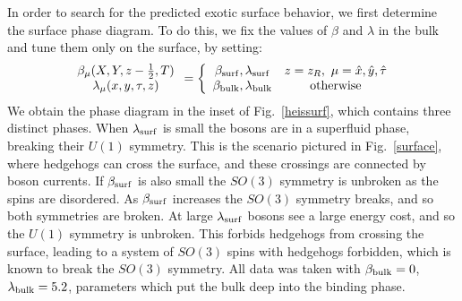 \documentclass[prb,twocolumn]{revtex4-1}
\begin{document}
In order to search for the predicted exotic surface behavior, we first determine the surface phase diagram.
To do this, we fix the values of $\beta$ and $\lambda$ in the bulk and tune them only on the surface, by setting:
\begin{equation}
\begin{array}{c}
\beta_\mu(X,Y,z-\frac{1}{2},T)\\
\lambda_\mu(x,y,\tau,z)\end{array}=
\left\{
\begin{array}{cc}
\beta_{\rm surf},\lambda_{\rm surf} & z=z_R,~\mu=\hat{x},\hat{y},\hat{\tau}\\
\beta_{\rm bulk},\lambda_{\rm bulk} & {\rm otherwise }
\end{array}\right.
\label{bulkvsurf}
\end{equation}
We obtain the phase diagram in the inset of Fig.~\ref{heissurf}, which contains three distinct phases. When $\lambda_{\rm surf}$ is small the bosons are in a superfluid phase, breaking their $U(1)$ symmetry. This is the scenario pictured in Fig.~\ref{surface}, where hedgehogs can cross the surface, and these crossings are connected by boson currents. If $\beta_{\rm surf}$ is also small the $SO(3)$ symmetry is unbroken as the spins are disordered. As $\beta_{\rm surf}$ increases the $SO(3)$ symmetry breaks, and so both symmetries are broken. At large $\lambda_{\rm surf}$ bosons see a large energy cost, and so the $U(1)$ symmetry is unbroken. This forbids hedgehogs from crossing the surface, leading to a system of $SO(3)$ spins with hedgehogs forbidden, which is known to break the $SO(3)$ symmetry.\cite{LauDasgupta} All data was taken with $\beta_{\rm bulk}=0$, $\lambda_{\rm bulk}=5.2$, parameters which put the bulk deep into the binding phase.
\end{document}
